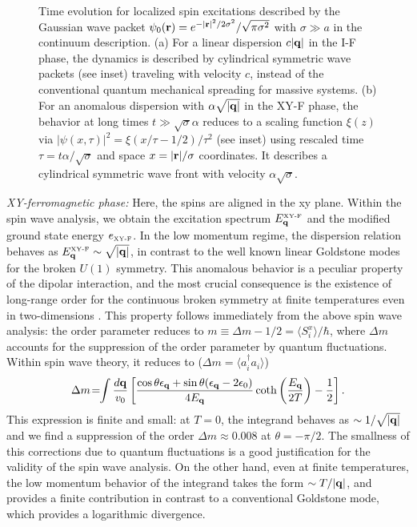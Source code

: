  

\begin{figure}[ht]
  \caption{ Time evolution for localized spin excitations described by the Gaussian wave packet $\psi_{0}({\bf r}) = e^{- |{\bf r}|^2/2\sigma^2}/\sqrt{\pi \sigma^2}$ 
  with $\sigma \gg a$ in the continuum description. (a) For a linear dispersion $c|{\bf q}|$ in the I-F phase, the dynamics is described by cylindrical symmetric wave packets (see inset) traveling 
  with velocity $c$, instead of the conventional quantum mechanical spreading for massive systems. 
  (b)  For an anomalous dispersion with $\alpha \sqrt{|{\bf q}|}$ in the XY-F phase, the behavior at long times $t\gg\sqrt{\sigma} \alpha$ reduces to a
  scaling function $\xi(z)$  via   $|\psi(x,\tau)|^2 = \xi(x/\tau -1/2)/\tau^2$ (see inset) using rescaled 
  time $\tau = t \alpha /\sqrt{\sigma}$ and space $x = |{\bf r}|/\sigma$ coordinates. It describes a cylindrical symmetric wave front with velocity 
  $\alpha \sqrt{\sigma}$.}\label{fig3}
\end{figure}


 
 
 {\it XY-ferromagnetic phase:} Here, the spins are aligned in the xy plane.
 Within the spin wave analysis, we obtain the excitation spectrum 
 $ E^{\mbox{\tiny{XY-F}}}_{\bf q}$ and the modified ground state energy 
 $e_{\mbox{\tiny{XY-F}}}$.
  In the low momentum regime, the dispersion relation behaves as $ E^{\mbox{\tiny XY-F}}_{\bf q} \sim \sqrt{|{\bf q}|}$,   in contrast to the well 
known  linear Goldstone modes for the broken $U(1)$ symmetry. 
This anomalous behavior is a peculiar property of the dipolar interaction, and the most crucial consequence
is the existence of long-range order for the continuous broken symmetry at finite temperatures 
even in two-dimensions \cite{bruno01}.
This property follows immediately from the above spin wave analysis:
the order parameter reduces to  $m \equiv \Delta m - 1/2=\langle S_{i}^{x}\rangle/\hbar $, where $\Delta m$  accounts for 
the suppression of the order parameter by quantum fluctuations. Within spin wave theory, it reduces to ($\Delta m = \langle a^{\dag}_{i} a_{i }\rangle$)
%
\begin{displaymath}
\Delta m\! = \!\!  \int \frac{d{\bf q}}{v_{0}}\left[\frac{\cos \theta \epsilon_{\bf q} +\sin \theta ( \epsilon_{\bf q}-2 \epsilon_{0})}{4 E_{\bf q} } \coth \left(\frac{E_{\bf q}}{2T}\right) - \frac{1}{2}\right] .
\end{displaymath}
%
This expression is finite and small: at $T=0$, the integrand behaves as  $\sim 1/\sqrt{|{\bf q}|}$ and we find a 
suppression of the order $\Delta m \approx 0.008$ at $\theta= - \pi/2 $. The smallness of this corrections due to
quantum fluctuations is a good justification for the validity of the spin wave analysis.  On the other hand, 
even at finite temperatures, the low momentum behavior of the integrand takes the form $\sim T/|{\bf q}|$, 
and provides a finite contribution in contrast to a conventional Goldstone mode, which provides a logarithmic divergence.


